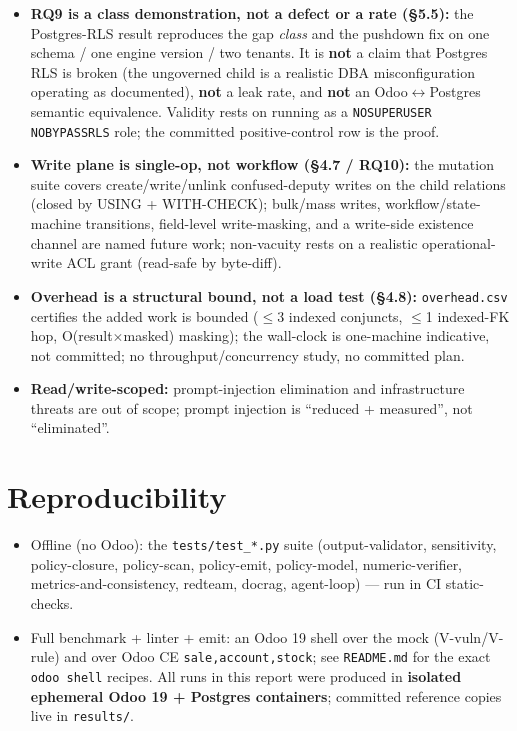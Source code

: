 \documentclass[11pt,a4paper]{article}
\newcommand{\code}[1]{\texttt{#1}}
\begin{document}
\begin{itemize}[leftmargin=*]
        the cleartext index and rank-order are named residuals, structural masking depends on field provenance
        (unstructured prose inherits the paraphrase residual), and no real-LLM / embedding RAG rate is claimed.
  \item \textbf{RQ9 is a class demonstration, not a defect or a rate (\S5.5):} the Postgres-RLS result
        reproduces the gap \emph{class} and the pushdown fix on one schema / one engine version / two tenants.
        It is \textbf{not} a claim that Postgres RLS is broken (the ungoverned child is a realistic DBA
        misconfiguration operating as documented), \textbf{not} a leak rate, and \textbf{not} an
        Odoo$\leftrightarrow$Postgres semantic equivalence. Validity rests on running as a
        \code{NOSUPERUSER NOBYPASSRLS} role; the committed positive-control row is the proof.
  \item \textbf{Write plane is single-op, not workflow (\S4.7 / RQ10):} the mutation suite covers
        create/write/unlink confused-deputy writes on the child relations (closed by USING + WITH-CHECK);
        bulk/mass writes, workflow/state-machine transitions, field-level write-masking, and a write-side
        existence channel are named future work; non-vacuity rests on a realistic operational-write ACL grant
        (read-safe by byte-diff).
  \item \textbf{Overhead is a structural bound, not a load test (\S4.8):} \code{overhead.csv} certifies the added
        work is bounded (\(\le\)3 indexed conjuncts, \(\le\)1 indexed-FK hop, O(result\(\times\)masked) masking);
        the wall-clock is one-machine indicative, not committed; no throughput/concurrency study, no committed plan.
  \item \textbf{Read/write-scoped:} prompt-injection elimination and infrastructure threats are out of scope;
        prompt injection is ``reduced + measured'', not ``eliminated''.
\end{itemize}

\section{Reproducibility}
\begin{itemize}[leftmargin=*]
  \item Offline (no Odoo): the \code{tests/test_*.py} suite (output-validator, sensitivity, policy-closure,
        policy-scan, policy-emit, policy-model, numeric-verifier, metrics-and-consistency, redteam, docrag,
        agent-loop) --- run in CI static-checks.
  \item Full benchmark + linter + emit: an Odoo 19 shell over the mock (V-vuln/V-rule) and over Odoo CE
        \code{sale,account,stock}; see \code{README.md} for the exact \code{odoo shell} recipes. All runs in
        this report were produced in \textbf{isolated ephemeral Odoo 19 + Postgres containers}; committed
        reference copies live in \code{results/}.
\end{itemize}
\end{document}
